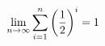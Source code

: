 \documentclass[preview]{standalone}
\begin{document}
\begin{align*}
\lim_{n \to \infty} \sum_{i=1}^{n} \left({ 1 } \over {2} \right)^i = { 1 }
\end{align*}
\end{document}
